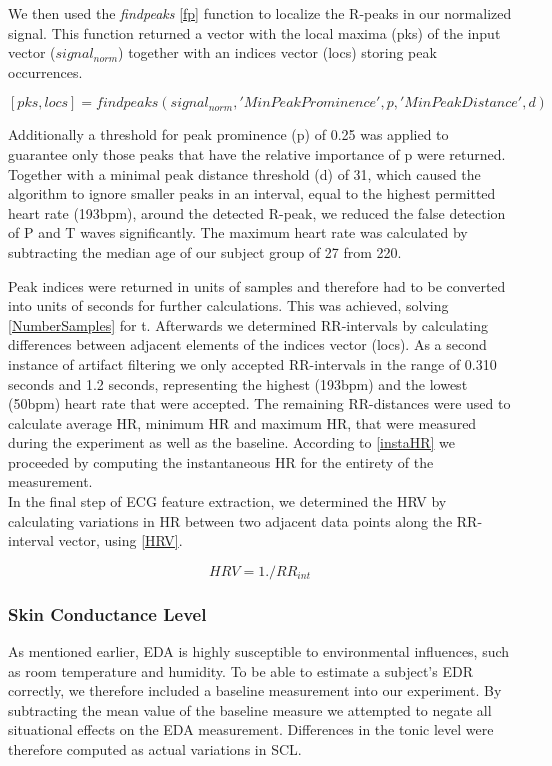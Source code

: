 \newpage
We then used the \textit{findpeaks} \ref{fp} function to localize the R-peaks in our normalized signal. This function returned a vector with the local maxima (pks) of the input vector ($signal_{norm}$) together with an indices vector (locs) storing peak occurrences. 

\begin{equation*}\label{fp}
[pks,locs] = findpeaks(signal_{norm},'MinPeakProminence',p,'MinPeakDistance',d)
\end{equation*}

Additionally a threshold for peak prominence (p) of 0.25 was applied to guarantee only those peaks that have the relative importance of p were returned. Together with a minimal peak distance threshold (d) of 31, which caused the algorithm to ignore smaller peaks in an interval, equal to the highest permitted heart rate (193bpm), around the detected R-peak, we reduced the false detection of P and T waves significantly. The maximum heart rate was calculated by subtracting the median age of our subject group of 27 from 220. 

Peak indices were returned in units of samples and therefore had to be converted into units of seconds for further calculations. This was achieved, solving \ref{NumberSamples} for t. Afterwards we 
determined RR-intervals by calculating differences between adjacent elements of the indices vector (locs). As a second instance of artifact filtering we only accepted RR-intervals in the range of 0.310 seconds and 1.2 seconds, representing the highest (193bpm) and the lowest (50bpm) heart rate that were accepted. The remaining RR-distances were used to calculate average HR, minimum HR and maximum HR, that were measured during the experiment as well as the baseline. According to \ref{instaHR} we proceeded by computing the instantaneous HR for the entirety of the measurement.\\

In the final step of ECG feature extraction, we determined the HRV by calculating variations in HR between two adjacent data points along the RR-interval vector, using \ref{HRV}.

\begin{equation}\label{HRV}
HRV = 1./RR_{int}
\end{equation}  

\newpage
\subsubsection{Skin Conductance Level}
As mentioned earlier, EDA is highly susceptible to environmental influences, such as room temperature and humidity. To be able to estimate a subject's EDR correctly, we therefore included a baseline measurement into our experiment. By subtracting the mean value of the baseline measure we attempted to negate all situational effects on the EDA measurement. Differences in the tonic level were therefore computed as actual variations in SCL.  

